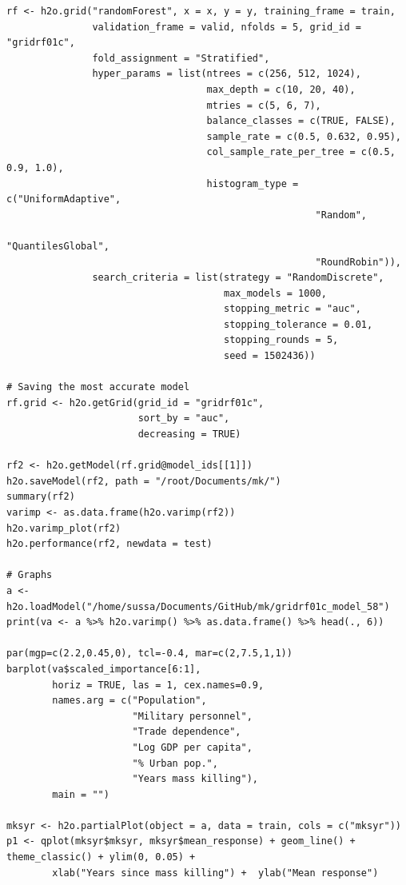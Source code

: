 \begin{verbatim}
rf <- h2o.grid("randomForest", x = x, y = y, training_frame = train, 
               validation_frame = valid, nfolds = 5, grid_id = "gridrf01c",
               fold_assignment = "Stratified",
               hyper_params = list(ntrees = c(256, 512, 1024),
                                   max_depth = c(10, 20, 40),
                                   mtries = c(5, 6, 7),
                                   balance_classes = c(TRUE, FALSE),
                                   sample_rate = c(0.5, 0.632, 0.95),
                                   col_sample_rate_per_tree = c(0.5, 0.9, 1.0),
                                   histogram_type = c("UniformAdaptive",
                                                      "Random",
                                                      "QuantilesGlobal",
                                                      "RoundRobin")),
               search_criteria = list(strategy = "RandomDiscrete", 
                                      max_models = 1000, 
                                      stopping_metric = "auc", 
                                      stopping_tolerance = 0.01, 
                                      stopping_rounds = 5, 
                                      seed = 1502436)) 

# Saving the most accurate model
rf.grid <- h2o.getGrid(grid_id = "gridrf01c",
                       sort_by = "auc",
                       decreasing = TRUE)

rf2 <- h2o.getModel(rf.grid@model_ids[[1]])
h2o.saveModel(rf2, path = "/root/Documents/mk/")
summary(rf2)
varimp <- as.data.frame(h2o.varimp(rf2))
h2o.varimp_plot(rf2)
h2o.performance(rf2, newdata = test)

# Graphs
a <- h2o.loadModel("/home/sussa/Documents/GitHub/mk/gridrf01c_model_58")
print(va <- a %>% h2o.varimp() %>% as.data.frame() %>% head(., 6)) 

par(mgp=c(2.2,0.45,0), tcl=-0.4, mar=c(2,7.5,1,1))
barplot(va$scaled_importance[6:1],
        horiz = TRUE, las = 1, cex.names=0.9,
        names.arg = c("Population", 
                      "Military personnel",
                      "Trade dependence", 
                      "Log GDP per capita",
                      "% Urban pop.",
                      "Years mass killing"),
        main = "")

mksyr <- h2o.partialPlot(object = a, data = train, cols = c("mksyr"))
p1 <- qplot(mksyr$mksyr, mksyr$mean_response) + geom_line() + theme_classic() + ylim(0, 0.05) +
        xlab("Years since mass killing") +  ylab("Mean response")
        

\end{verbatim}
